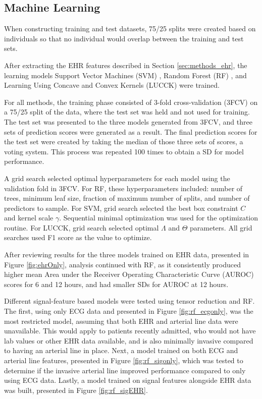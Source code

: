 \subsection{Machine Learning} \label{sec:methods_ml}
When constructing training and test datasets, 75/25 splits were created based on individuals so that no individual would overlap between the training and test sets.

After extracting the EHR features described in Section \ref{sec:methods_ehr}, the learning models Support Vector Machines (SVM) \cite{cortes_support-vector_1995}, Random Forest (RF) \cite{breiman_random_2001}, and Learning Using Concave and Convex Kernels (LUCCK) \cite{sabeti_learning_2019} were trained.

For all methods, the training phase consisted of 3-fold cross-validation (3FCV) on a 75/25 split of the data, where the test set was held and not used for training. The test set was presented to the three models generated from 3FCV, and three sets of prediction scores were generated as a result. The final prediction scores for the test set were created by taking the median of those three sets of scores, a voting system. This process was repeated 100 times to obtain a SD for model performance. 

A grid search selected optimal hyperparameters for each model using the validation fold in 3FCV. For RF, these hyperparameters included: number of trees, minimum leaf size, fraction of maximum number of splits, and number of predictors to sample. For SVM, grid search selected the best box constraint $C$ and kernel scale $\gamma$. Sequential minimal optimization \cite{JMLR:v6:fan05a} was used for the optimization routine. For LUCCK, grid search selected optimal $\Lambda$ and $\Theta$ parameters. All grid searches used F1 score as the value to optimize. 

After reviewing results for the three models trained on EHR data, presented in Figure \ref{fig:ehrOnly}, analysis continued with RF, as it consistently produced higher mean Area under the Receiver Operating Characteristic Curve (AUROC) scores for 6 and 12 hours, and had smaller SDs for AUROC at 12 hours. 

Different signal-feature based models were tested using tensor reduction and RF. The first, using only ECG data and presented in Figure \ref{fig:rf_ecgonly}, was the most restricted model, assuming that both EHR and arterial line data were unavailable. This would apply to patients recently admitted, who would not have lab values or other EHR data available, and is also minimally invasive compared to having an arterial line in place. Next, a model trained on both ECG and arterial line features, presented in Figure \ref{fig:rf_sigonly}, which was tested to determine if the invasive arterial line improved performance compared to only using ECG data. Lastly, a model trained on signal features alongside EHR data was built, presented in Figure \ref{fig:rf_sigEHR}.